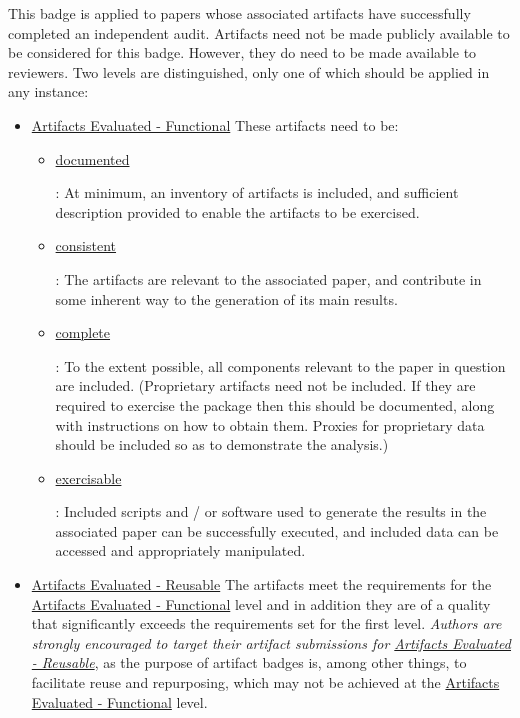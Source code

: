 \documentclass[twoside,a4paper]{refart}
\newcommand{\evaluated}{\protect\hyperlink{evaluated}{Artifacts Evaluated}\xspace}
\newcommand{\functionalfull}{\protect\hyperlink{functional}{Artifacts Evaluated - Functional}\xspace}
\newcommand{\reusablefull}{\protect\hyperlink{reusable}{Artifacts Evaluated - Reusable}\xspace}
\newcommand{\documented}{\protect\hyperlink{documented}{documented}\xspace}
\newcommand{\consistent}{\protect\hyperlink{consistent}{consistent}\xspace}
\newcommand{\complete}{\protect\hyperlink{complete}{complete}\xspace}
\newcommand{\exercisable}{\protect\hyperlink{exercisable}{exercisable}\xspace}
\begin{document}
\marginlabel{\evaluated:} This badge is applied to papers whose
associated artifacts have successfully completed an independent audit.
Artifacts need not be made publicly available to be considered for
this badge. However, they do need to be made available to reviewers.
Two levels are distinguished, only one of which should be applied in
any instance:
\begin{itemize}
\item \functionalfull These artifacts need to be:
  \begin{itemize}
  \item \hypertarget{documented}{\documented}: At minimum, an inventory
    of artifacts is included, and sufficient description provided to
    enable the artifacts to be exercised.

  \item \hypertarget{consistent}{\consistent}: The artifacts are
    relevant to the associated paper, and contribute in some inherent
    way to the generation of its main results.

  \item \hypertarget{complete}{\complete}: To the extent possible, all
    components relevant to the paper in question are included.
    (Proprietary artifacts need not be included. If they are required
    to exercise the package then this should be documented, along with
    instructions on how to obtain them. Proxies for proprietary data
    should be included so as to demonstrate the analysis.)

  \item \hypertarget{exercisable}{\exercisable}: Included scripts and
    / or software used to generate the results in the associated paper
    can be successfully executed, and included data can be accessed
    and appropriately manipulated.
    \end{itemize}

  \item \reusablefull The artifacts meet the requirements for the
    \functionalfull level and in addition they are of a quality that
    significantly exceeds the requirements set for the first level.
    \emph{Authors are strongly encouraged to target their artifact
      submissions for \reusablefull}, as the purpose of artifact
    badges is, among other things, to facilitate reuse and
    repurposing, which may not be achieved at the \functionalfull
    level.
\end{itemize}
\end{document}
